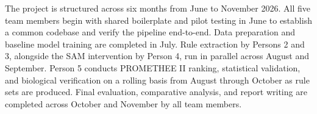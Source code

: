 The project is structured across six months from June to November 2026. All five team members
begin with shared boilerplate and pilot testing in June to establish a common codebase and verify
the pipeline end-to-end. Data preparation and baseline model training are completed in July.
Rule extraction by Persons 2 and 3, alongside the SAM intervention by Person 4, run in
parallel across August and September. Person 5 conducts PROMETHEE II ranking, statistical
validation, and biological verification on a rolling basis from August through October as rule
sets are produced. Final evaluation, comparative analysis, and report writing are completed
across October and November by all team members.

\vspace{1em}

